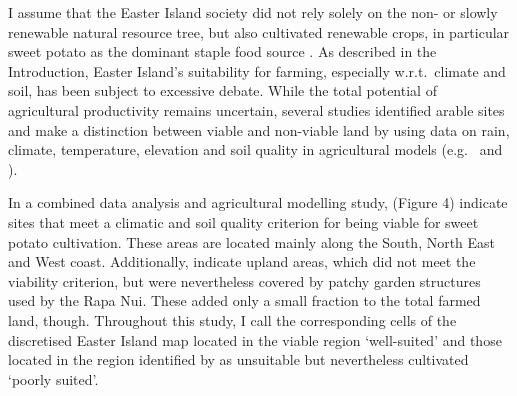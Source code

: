 I assume that the Easter Island society did not rely solely on the non- or slowly renewable natural resource tree, but also cultivated renewable crops, in particular sweet potato as the dominant staple food source \citep{Louwagie2006}.
As described in the Introduction, Easter Island's suitability for farming, especially w.r.t.\ climate and soil, has been subject to excessive debate.
While the total potential of agricultural productivity remains uncertain, several studies identified arable sites and make a distinction between viable and non-viable land by using data on rain, climate, temperature, elevation and soil quality in agricultural models (e.g.\ \citet{Louwagie2006} and \citet{Puleston2017}).

In a combined data analysis and agricultural modelling study, \citet{Puleston2017} (Figure 4) indicate sites that meet a climatic and soil quality criterion for being viable for sweet potato cultivation.
These areas are located mainly along the South, North East and West coast. 
Additionally, \citet{Puleston2017} indicate upland areas, which did not meet the viability criterion, but were nevertheless covered by patchy garden structures used by the Rapa Nui.
These added only a small fraction to the total farmed land, though.
Throughout this study, I call the corresponding cells of the discretised Easter Island map located in the viable region `well-suited' and those located in the region identified by \citet{Puleston2017} as unsuitable but nevertheless cultivated `poorly suited'.

